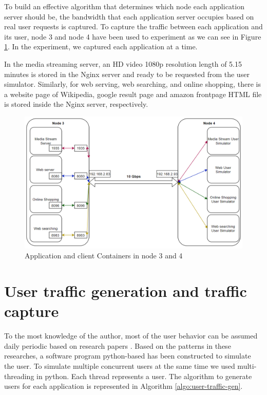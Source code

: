 \documentclass[conference]{IEEEtran}
\begin{document}
To build an effective algorithm that determines which node each application server should be, the bandwidth that each application server occupies based on real user requests is captured. To capture the traffic between each application and its user, node 3 and node 4 have been used to experiment as we can see in Figure \ref{fig:server_deployment}. In the experiment, we captured each application at a time.

In the media streaming server, an HD video 1080p resolution length of 5.15 minutes is stored in the Nginx server and ready to be requested from the user simulator. Similarly, for web serving, web searching, and online shopping, there is a website page of Wikipedia, google result page and amazon frontpage HTML file is stored inside the Nginx server, respectively.

\begin{figure}[]
    \centering
        \includegraphics[scale = 0.3]{imgs/server_deployment.png}
        \caption{Application and client Containers in node 3 and 4}
        \label{fig:server_deployment}
    \end{figure}



\section{User traffic generation and traffic capture}
\label{sec:User traffic generation}
 
To the most knowledge of the author, most of the user behavior can be assumed daily periodic based on research papers \cite{Kooti2016,Ullah2012,Taghavi2012,Yu2006}. Based on the patterns in these researches, a software program python-based has been constructed to simulate the user. To simulate multiple concurrent users at the same time we used multi-threading in python. Each thread represents a user. The algorithm to generate users for each application is represented in Algorithm \ref{algo:user-traffic-gen}. 
\end{document}
